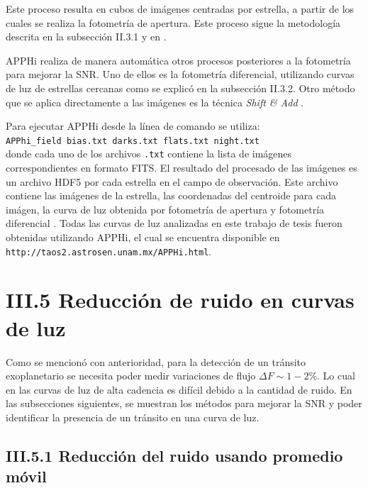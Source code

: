 Este proceso resulta en cubos de imágenes centradas por estrella, a partir de los cuales se realiza la fotometría de apertura. Este proceso sigue la metodología descrita en la subsección II.3.1 y en \cite{romanishin2006introduction}. 

APPHi realiza de manera automática otros procesos posteriores a la fotometría para mejorar la SNR. Uno de ellos es la fotometría diferencial, utilizando curvas de luz de estrellas cercanas como se explicó en la subsección II.3.2. Otro método que se aplica directamente a las imágenes es la técnica \textit{Shift \& Add} \cite{kluckers1996comparison}. 

Para ejecutar APPHi desde la línea de comando se utiliza:\\

\texttt{APPhi\_field bias.txt darks.txt flats.txt night.txt}\\

\noindent donde cada uno de los archivos \texttt{.txt} contiene la lista de imágenes correspondientes en formato FITS. El resultado del procesado de las imágenes es un archivo HDF5 por cada estrella en el campo de observación. Este archivo contiene las imágenes de la estrella, las coordenadas del centroide para cada imágen, la curva de luz obtenida por fotometría de apertura y fotometría diferencial \citep{sanchez2019apphi}. Todas las curvas de luz analizadas en este trabajo de tesis fueron obtenidas utilizando APPHi, el cual se encuentra disponible en \texttt{http://taos2.astrosen.unam.mx/APPHi.html}.

\section*{III.5 Reducción de ruido en curvas de luz}

Como se mencionó con anterioridad, para la detección de un tránsito exoplanetario se necesita poder medir variaciones de flujo $\Delta F \sim 1-2\%$. Lo cual en las curvas de luz de alta cadencia es difícil debido a la cantidad de ruido. En las subsecciones siguientes, se muestran los métodos para mejorar la SNR y poder identificar la presencia de un tránsito en una curva de luz.

\subsection*{III.5.1 Reducción del ruido usando promedio móvil}


